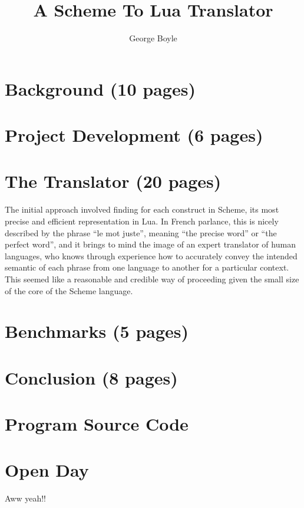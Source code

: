\documentclass[a4paper,10pt]{report}
\begin{document}
\title{A Scheme To Lua Translator}
\author{George Boyle}
\maketitle

\tableofcontents

\chapter{Background (10 pages)}





\lipsum[1-20]

\chapter{Project Development (6 pages)}

\lipsum[1-20]


\chapter{The Translator (20 pages)}

The initial approach involved finding for each construct in Scheme, its most
precise and efficient representation in Lua. In French parlance, this is nicely
described by the phrase ``le mot juste'', meaning ``the precise word'' or ``the
perfect word'', and it brings to mind the image of an expert translator of
human languages, who knows through experience how to accurately convey the
intended semantic of each phrase from one language to another for a particular
context.  This seemed like a reasonable and credible way of proceeding given
the small size of the core of the Scheme language.

\lipsum[21-50]


\chapter{Benchmarks (5 pages)}

\lipsum[51-70]


\chapter{Conclusion (8 pages)}


\lipsum[71-100]


\appendix

\chapter{Program Source Code}



\chapter{Open Day}
Aww yeah!!
\end{document}
